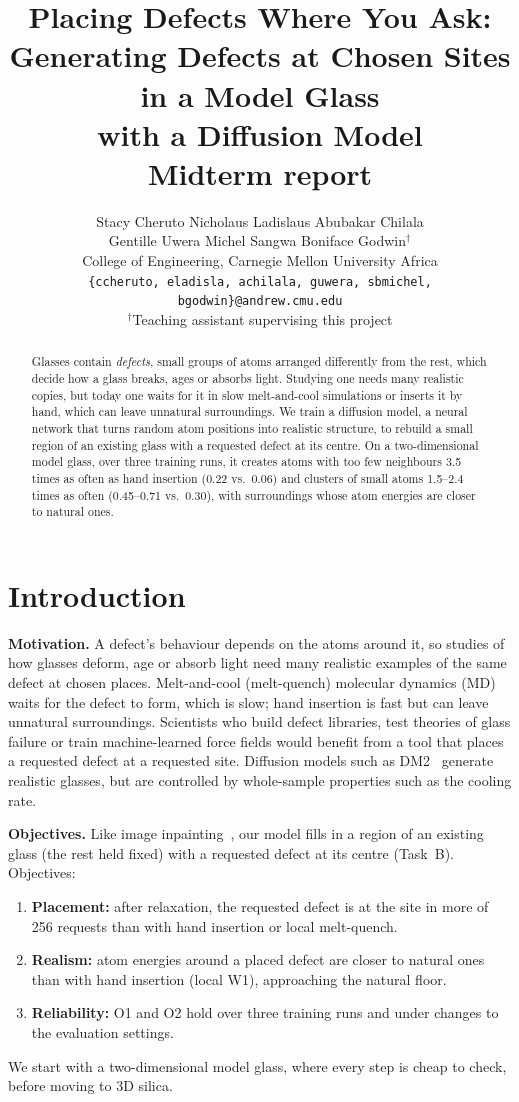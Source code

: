 \documentclass[10pt]{article}
\title{Placing Defects Where You Ask:\\ Generating Defects at Chosen Sites in a Model Glass\\ with a Diffusion Model\\[4pt] \large Midterm report}
\author{
  Stacy Cheruto \quad Nicholaus Ladislaus \quad Abubakar Chilala\\ Gentille Uwera \quad Michel Sangwa \quad Boniface Godwin$^{\dagger}$\\[2pt]
  College of Engineering, Carnegie Mellon University Africa\\
  {\small\texttt{\{ccheruto, eladisla, achilala, guwera, sbmichel, bgodwin\}@andrew.cmu.edu}}\\
  {\small $^{\dagger}$Teaching assistant supervising this project}
}
\date{}
\begin{document}
\maketitle

\begin{abstract}
Glasses contain \emph{defects}, small groups of atoms arranged differently from the rest, which decide how a glass breaks, ages or absorbs light. Studying one needs many realistic copies, but today one waits for it in slow melt-and-cool simulations or inserts it by hand, which can leave unnatural surroundings. We train a diffusion model, a neural network that turns random atom positions into realistic structure, to rebuild a small region of an existing glass with a requested defect at its centre. On a two-dimensional model glass, over three training runs, it creates atoms with too few neighbours 3.5 times as often as hand insertion (0.22 vs.\ 0.06) and clusters of small atoms 1.5--2.4 times as often (0.45--0.71 vs.\ 0.30), with surroundings whose atom energies are closer to natural ones.
\end{abstract}

\section{Introduction}

\textbf{Motivation.} A defect's behaviour depends on the atoms around it, so studies of how glasses deform, age or absorb light need many realistic examples of the same defect at chosen places. Melt-and-cool (melt-quench) molecular dynamics (MD) waits for the defect to form, which is slow; hand insertion is fast but can leave unnatural surroundings. Scientists who build defect libraries, test theories of glass failure or train machine-learned force fields would benefit from a tool that places a requested defect at a requested site. Diffusion models such as DM2~\citep{yang2026dm2} generate realistic glasses, but are controlled by whole-sample properties such as the cooling rate.

\textbf{Objectives.} Like image inpainting~\citep{lugmayr2022repaint}, our model fills in a region of an existing glass (the rest held fixed) with a requested defect at its centre (Task~B). Objectives:
\begin{enumerate}
\item[\textbf{O1}] \textbf{Placement:} after relaxation, the requested defect is at the site in more of 256 requests than with hand insertion or local melt-quench.
\item[\textbf{O2}] \textbf{Realism:} atom energies around a placed defect are closer to natural ones than with hand insertion (local W1), approaching the natural floor.
\item[\textbf{O3}] \textbf{Reliability:} O1 and O2 hold over three training runs and under changes to the evaluation settings.
\end{enumerate}
We start with a two-dimensional model glass, where every step is cheap to check, before moving to 3D silica.
\end{document}
